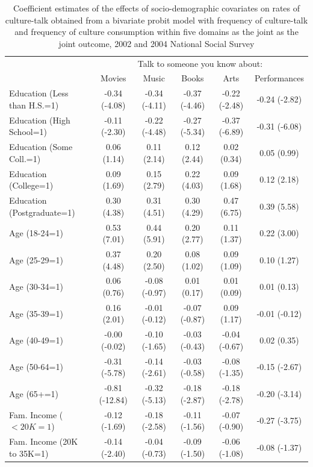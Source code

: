 \documentclass[11pt]{article}
\begin{document}
\begin{table}[t]
\caption{Coefficient estimates of the effects of socio-demographic covariates on rates of culture-talk obtained from a bivariate probit model with frequency of culture-talk and frequency of culture consumption within five domains as the joint as the joint outcome, 2002 and 2004 National Social Survey}
\begin{tabular*}{\hsize}{@{\extracolsep{\fill}} l*{5}{c}}
\hline
\hline
&\multicolumn{5}{c}{Talk to someone you know about:}\\
&Movies&Music&Books&Arts&Performances\\
\hline
Education (Less than H.S.=1)  &-0.34 (-4.08)&-0.34 (-4.11)&-0.37 (-4.46)&-0.22 (-2.48)&-0.24 (-2.82)\\
Education (High School=1)     &-0.11 (-2.30)&-0.22 (-4.48)&-0.27 (-5.34)&-0.37 (-6.89)&-0.31 (-6.08)\\
Education (Some Coll.=1)      &0.06 (1.14)&0.11 (2.14)&0.12 (2.44)&0.02 (0.34)&0.05 (0.99)\\
Education (College=1)         &0.09 (1.69)&0.15 (2.79)&0.22 (4.03)&0.09 (1.68)&0.12 (2.18)\\
Education (Postgraduate=1)    &0.30 (4.38)&0.31 (4.51)&0.30 (4.29)&0.47 (6.75)&0.39 (5.58)\\
Age (18-24=1)                 &0.53 (7.01)&0.44 (5.91)&0.20 (2.77)&0.11 (1.37)&0.22 (3.00)\\
Age (25-29=1)                 &0.37 (4.48)&0.20 (2.50)&0.08 (1.02)&0.09 (1.09)&0.10 (1.27)\\
Age (30-34=1)                 &0.06 (0.76)&-0.08 (-0.97)&0.01 (0.17)&0.01 (0.09)&0.01 (0.13)\\
Age (35-39=1)                 &0.16 (2.01)&-0.01 (-0.12)&-0.07 (-0.87)&0.09 (1.17)&-0.01 (-0.12)\\
Age (40-49=1)                 &-0.00 (-0.02)&-0.10 (-1.65)&-0.03 (-0.43)&-0.04 (-0.67)&0.02 (0.35)\\
Age (50-64=1)                 &-0.31 (-5.78)&-0.14 (-2.61)&-0.03 (-0.58)&-0.08 (-1.35)&-0.15 (-2.67)\\
Age (65+=1)                   &-0.81 (-12.84)&-0.32 (-5.13)&-0.18 (-2.87)&-0.18 (-2.78)&-0.20 (-3.14)\\
Fam. Income ($<20K=1$)          &-0.12 (-1.69)&-0.18 (-2.58)&-0.11 (-1.56)&-0.07 (-0.90)&-0.27 (-3.75)\\
Fam. Income (20K to 35K=1)   &-0.14 (-2.40)&-0.04 (-0.73)&-0.09 (-1.50)&-0.06 (-1.08)&-0.08 (-1.37)\\

\end{tabular*}
\end{table}
\end{document}
